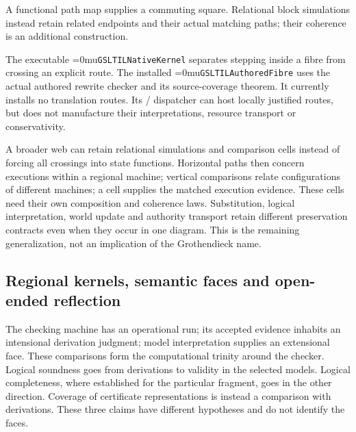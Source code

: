 \documentclass[11pt,a4paper]{article}
\newcommand{\code}[1]{\texttt{\detokenize{#1}}}
\newcommand{\name}[1]{\textup{\Urlmuskip=0mu\relax\nolinkurl{#1}}}
\newcommand{\diagramcaption}[1]{\par{\small\color{ink}#1\par}\medskip}
\begin{document}
\begin{center}
\end{center}
\diagramcaption{A functional path map supplies a commuting square. Relational
block simulations instead retain related endpoints and their actual matching
paths; their coherence is an additional construction.}

The executable \name{GSLTILNativeKernel} separates stepping inside a fibre
from crossing an explicit route. The installed \name{GSLTILAuthoredFibre}
uses the actual authored rewrite checker and its source-coverage theorem.
It currently installs no translation routes. Its \code{at}/\code{via}
dispatcher can host locally justified routes, but does not manufacture their
interpretations, resource transport or conservativity.

A broader web can retain relational simulations and comparison cells instead
of forcing all crossings into state functions. Horizontal paths then concern
executions within a regional machine; vertical comparisons relate configurations
of different machines; a cell supplies the matched execution evidence. These
cells need their own composition and coherence laws. Substitution, logical
interpretation, world update and authority transport retain different
preservation contracts even when they occur in one diagram. This is the
remaining generalization, not an implication of the Grothendieck name.

\subsection{Regional kernels, semantic faces and open-ended reflection}

The checking machine has an operational run; its accepted evidence inhabits
an intensional derivation judgment; model interpretation supplies an
extensional face. These comparisons form the computational trinity around the
checker. Logical soundness goes from derivations to validity in the selected
models. Logical completeness, where established for the particular fragment,
goes in the other direction. Coverage of certificate representations is
instead a comparison with derivations. These three claims have different
hypotheses and do not identify the faces.
\end{document}
